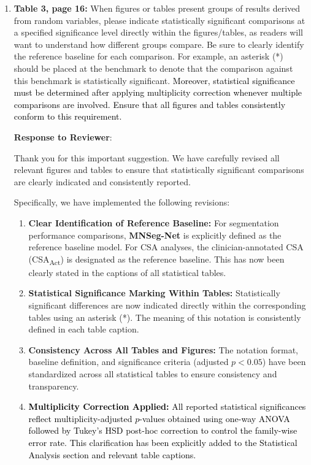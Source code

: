 \documentclass[12pt,letterpaper]{article}
\begin{document}
\begin{enumerate}
    
    \item \textbf{Table 3, page 16:} When figures or tables present groups of results derived from random variables, please indicate statistically significant comparisons at a specified significance level directly within the figures/tables, as readers will want to understand how different groups compare. Be sure to clearly identify the reference baseline for each comparison. For example, an asterisk (*) should be placed at the benchmark to denote that the comparison against this benchmark is statistically significant. \textcolor{black}{Moreover, statistical significance must be determined after applying multiplicity correction whenever multiple comparisons are involved. Ensure that all figures and tables consistently conform to this requirement.}





\textbf{Response to Reviewer}:

Thank you for this important suggestion. We have carefully revised all relevant figures and tables to ensure that statistically significant comparisons are clearly indicated and consistently reported.

Specifically, we have implemented the following revisions:

\begin{enumerate}

    \item \textbf{Clear Identification of Reference Baseline:}  
    For segmentation performance comparisons, \textbf{MNSeg-Net} is explicitly defined as the reference baseline model. For CSA analyses, the clinician-annotated CSA (CSA\textsubscript{Act}) is designated as the reference baseline. This has now been clearly stated in the captions of all statistical tables.

    \item \textbf{Statistical Significance Marking Within Tables:}  
    Statistically significant differences are now indicated directly within the corresponding tables using an asterisk (*). The meaning of this notation is consistently defined in each table caption.


    \item \textbf{Consistency Across All Tables and Figures:}  
    The notation format, baseline definition, and significance criteria (adjusted $p < 0.05$) have been standardized across all statistical tables to ensure consistency and transparency.

    \item \textcolor{black}{\textbf{Multiplicity Correction Applied:}  }
    \textcolor{black}{All reported statistical significances reflect multiplicity-adjusted $p$-values obtained using one-way ANOVA followed by Tukey’s HSD post-hoc correction to control the family-wise error rate. This clarification has been explicitly added to the Statistical Analysis section and relevant table captions.}


\end{enumerate}
\end{enumerate}
\end{document}
